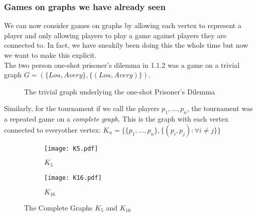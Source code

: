 \subsubsection{Games on graphs we have already seen}
We can now consider games on graphs by allowing each vertex to represent a player and only allowing players to play a game against players they are connected to. In fact, we have sneakily been doing this the whole time but now we want to make this explicit.\\
The two person one-shot prisoner's dilemma in 1.1.2 was a game on a trivial graph $G=(\{Lou,Avery\},\{(Lou,Avery)\})$.\\
\begin{figure}[h]
	\centering
	\caption{The trivial graph underlying the one-shot Prisoner's Dilemma}
\end{figure}
Similarly, for the tournament if we call the players $p_1,...,p_n$, the tournament was a repeated game on a \textit{complete graph}. This is the graph with each vertex connected to everyother vertex: $K_n=\{\{p_1,...,p_n\},\{(p_i,p_j):\forall i\neq j\}\}$\\

\begin{figure}
	\centering
	\begin{subfigure}{.5\textwidth}
		\centering
		\texttt{[image: K5.pdf]}
		\caption{$K_5$}
		\label{fig:K5}
	\end{subfigure}%
	\begin{subfigure}{.5\textwidth}
		\centering
		\texttt{[image: K16.pdf]}
		\caption{$K_{16}$}
		\label{fig:K16}
	\end{subfigure}
	\caption{The Complete Graphs $K_5$ and $K_{16}$}
	\label{fig:complete graphs}
\end{figure}


